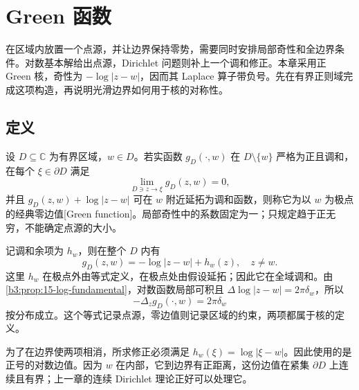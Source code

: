 \section{Green 函数}
\label{b3:sec:1701}

在区域内放置一个点源，并让边界保持零势，需要同时安排局部奇性和全边界条件。对数基本解给出点源，Dirichlet 问题则补上一个调和修正。本章采用正 Green 核，奇性为 \(-\log|z-w|\)，因而其 Laplace 算子带负号。先在有界正则域完成这项构造，再说明光滑边界如何用于核的对称性。

\subsection{定义}
\label{b3:subsec:170101}

设 \(D\subseteq\mathbb C\) 为有界区域，\(w\in D\)。若实函数 \(g_D(\cdot,w)\) 在 \(D\setminus\{w\}\) 严格为正且调和，在每个 \(\xi\in\partial D\) 满足
\[
 \lim_{D\ni z\to\xi}g_D(z,w)=0,
\]
并且 \(g_D(z,w)+\log|z-w|\) 可在 \(w\) 附近延拓为调和函数，则称它为以 \(w\) 为极点的经典零边值[Green function]。局部奇性中的系数固定为一；只规定趋于正无穷，不能确定点源的大小。

\ProseParagraphBreak
记调和余项为 \(h_w\)，则在整个 \(D\) 内有
\[
 g_D(z,w)=-\log|z-w|+h_w(z),\quad z\ne w.
\]
这里 \(h_w\) 在极点外由等式定义，在极点处由假设延拓；因此它在全域调和。由\cref{b3:prop:15-log-fundamental}，对数函数局部可积且
\(\Delta\log|z-w|=2\pi\delta_w\)，所以
\[
 -\Delta_zg_D(\cdot,w)=2\pi\delta_w
\]
按分布成立。这个等式记录点源，零边值则记录区域的约束，两项都属于核的定义。

\ProseParagraphBreak
为了在边界使两项相消，所求修正必须满足
\(h_w(\xi)=\log|\xi-w|\)。因此使用的是正号的对数边值。因为 \(w\) 在内部，它到边界有正距离，这份边值在紧集 \(\partial D\) 上连续且有界；上一章的连续 Dirichlet 理论正好可以处理它。

